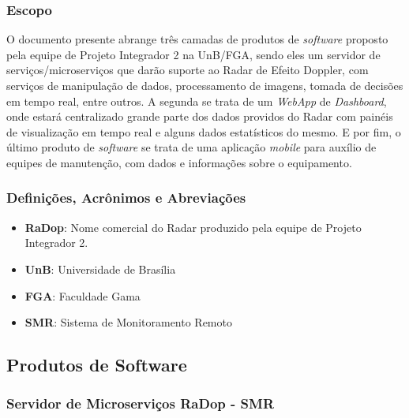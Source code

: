 \subsubsection{Escopo}\label{escopo}

O documento presente abrange três camadas de produtos de \emph{software}
proposto pela equipe de Projeto Integrador 2 na UnB/FGA, sendo eles um
servidor de serviços/microserviços que darão suporte ao Radar de Efeito
Doppler, com serviços de manipulação de dados, processamento de imagens,
tomada de decisões em tempo real, entre outros. A segunda se trata de um
\emph{WebApp} de \emph{Dashboard}, onde estará centralizado grande parte dos dados
providos do Radar com painéis de visualização em tempo real e alguns
dados estatísticos do mesmo. E por fim, o último produto de \emph{software} se
trata de uma aplicação \emph{\emph{mobile}} para auxílio de equipes de
manutenção, com dados e informações sobre o equipamento.

\subsubsection{Definições, Acrônimos e Abreviações}\label{definicoes-acronimos-e-abreviacoes}

\begin{itemize}
\tightlist
\item
  \textbf{RaDop}: Nome comercial do Radar produzido pela equipe de
  Projeto Integrador 2.
\item
  \textbf{UnB}: Universidade de Brasília
\item
  \textbf{FGA}: Faculdade Gama
\item
  \textbf{SMR}: Sistema de Monitoramento Remoto
\end{itemize}

\subsection{Produtos de Software}\label{produtos-de-software}

\subsubsection{Servidor de Microserviços RaDop - SMR}\label{servidor-de-microservicos-radop---smr}

